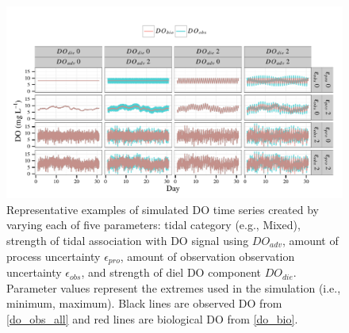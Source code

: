 \documentclass[letterpaper,12pt,oneside]{article}\usepackage[]{graphicx}\usepackage[]{color}
\makeatletter
\def\maxwidth{ %
  \ifdim\Gin@nat@width>\linewidth
    \linewidth
  \else
    \Gin@nat@width
  \fi
}
\newenvironment{knitrout}{}{} %
\makeatother
\begin{document}
\centering\vspace*{\fill}
\begin{knitrout}
\color{fgcolor}\begin{figure}[!ht]


{\centering \includegraphics[width=\maxwidth]{figure/sim_ex} 

}

\caption[Representative examples of simulated \ac{DO} time series created by varying each of five parameters]{Representative examples of simulated \ac{DO} time series created by varying each of five parameters: tidal category (e.g., Mixed), strength of tidal association with \ac{DO} signal using $DO_{adv}$, amount of process uncertainty $\epsilon_{pro}$, amount of observation observation uncertainty $\epsilon_{obs}$, and strength of diel \ac{DO} component $DO_{die}$.  Parameter values represent the extremes used in the simulation (i.e., minimum, maximum).  Black lines are observed \ac{DO} from \cref{do_obs_all} and red lines are biological \ac{DO} from \cref{do_bio}.\label{fig:sim_ex}}
\end{figure}


\end{knitrout}
\vfill
\clearpage
\end{document}
